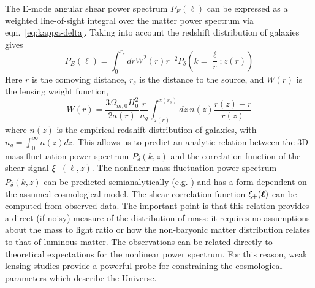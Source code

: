 The E-mode angular shear power spectrum $P_E(\ell)$ can be expressed as a
weighted line-of-sight integral over the matter power 
spectrum via eqn.~\ref{eq:kappa-delta}.  Taking into account the redshift
distribution of galaxies gives \citep[see][]{Takada04}
\begin{equation}
  P_E(\ell) = \int_0^{r_s}dr W^2(r)r^{-2}
  P_\delta\left(k=\frac{\ell}{r};z(r)\right)
\end{equation}
Here $r$ is the comoving distance, $r_s$ is the distance to the
source, and $W(r)$ is the lensing weight function,
\begin{equation}
  \label{eq:lens_weight}
  W(r) = \frac{3\Omega_{m,0}H_0^2}{2a(r)}\frac{r}{\bar{n}_g}
  \int_{z(r)}^{z(r_s)}dz\ n(z) \frac{r(z)-r}{r(z)}
\end{equation}
where $n(z)$ is the empirical redshift distribution of galaxies,
with $\bar{n}_g = \int_0^\infty n(z)dz$.
This allows us to predict an analytic relation between the 3D mass
fluctuation power spectrum $P_\delta(k, z)$ and the correlation function
of the shear signal $\xi_+(\ell, z)$.
The nonlinear mass fluctuation power spectrum $P_\delta(k, z)$ can be
predicted semianalytically (e.g. \citet{Smith03}) and has a form dependent on
the assumed cosmological model.
The shear correlation function $\xi_+(\boldsymbol{\ell})$
can be computed from observed data.  The important point is that this
relation provides a direct (if noisy) measure of the distribution of mass:
it requires no assumptions
about the mass to light ratio or how the non-baryonic matter distribution
relates to that of luminous matter. The observations can be related directly
to theoretical expectations for the nonlinear power spectrum.
For this reason, weak lensing studies provide a powerful
probe for constraining the cosmological parameters which describe
the Universe.

